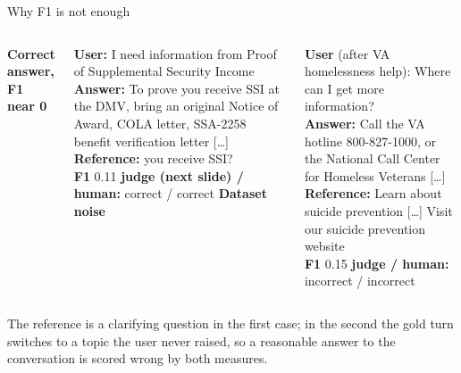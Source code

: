 \documentclass[aspectratio=169,11pt]{beamer}
\begin{document}
\begin{frame}{Why F1 is not enough}
\footnotesize
\begin{columns}[T]
\textbf{Correct answer, F1 near 0} %
\par\vspace{2pt}
\textbf{User:} I need information from Proof of Supplemental Security Income\\[3pt]
\textbf{Answer:} To prove you receive SSI at the DMV, bring an original Notice of Award, COLA letter, SSA-2258 benefit verification letter [\ldots]\\[3pt]
\textbf{Reference:} you receive SSI?\\[3pt]
\textbf{F1} 0.11 \quad \textbf{judge (next slide) / human:} correct / correct
\textbf{Dataset noise} %
\par\vspace{2pt}
\textbf{User} (after VA homelessness help): Where can I get more information?\\[3pt]
\textbf{Answer:} Call the VA hotline 800-827-1000, or the National Call Center for Homeless Veterans [\ldots]\\[3pt]
\textbf{Reference:} Learn about suicide prevention [\ldots] Visit our suicide prevention website\\[3pt]
\textbf{F1} 0.15 \quad \textbf{judge / human:} incorrect / incorrect
\end{columns}

\vspace{3mm}
\small The reference is a clarifying question in the first case; in the second the gold turn switches to a topic the user never raised, so a reasonable answer to the conversation is scored wrong by both measures.
\end{frame}
\end{document}
